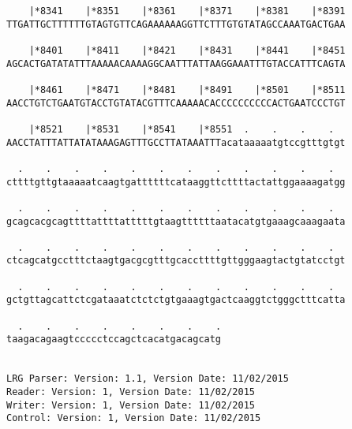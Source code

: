 \documentclass{article}
\begin{document}
\begin{Verbatim}
    |*8341    |*8351    |*8361    |*8371    |*8381    |*8391
TTGATTGCTTTTTTGTAGTGTTCAGAAAAAAGGTTCTTTGTGTATAGCCAAATGACTGAA
                                                            
    |*8401    |*8411    |*8421    |*8431    |*8441    |*8451
AGCACTGATATATTTAAAAACAAAAGGCAATTTATTAAGGAAATTTGTACCATTTCAGTA
                                                            
    |*8461    |*8471    |*8481    |*8491    |*8501    |*8511
AACCTGTCTGAATGTACCTGTATACGTTTCAAAAACACCCCCCCCCCACTGAATCCCTGT
                                                            
    |*8521    |*8531    |*8541    |*8551  .    .    .    .  
AACCTATTTATTATATAAAGAGTTTGCCTTATAAATTTacataaaaatgtccgtttgtgt
                                                            
  .    .    .    .    .    .    .    .    .    .    .    .  
cttttgttgtaaaaatcaagtgattttttcataaggttcttttactattggaaaagatgg
                                                            
  .    .    .    .    .    .    .    .    .    .    .    .  
gcagcacgcagttttattttatttttgtaagttttttaatacatgtgaaagcaaagaata
                                                            
  .    .    .    .    .    .    .    .    .    .    .    .  
ctcagcatgcctttctaagtgacgcgtttgcaccttttgttgggaagtactgtatcctgt
                                                            
  .    .    .    .    .    .    .    .    .    .    .    .  
gctgttagcattctcgataaatctctctgtgaaagtgactcaaggtctgggctttcatta
                                                            
  .    .    .    .    .    .    .    .
taagacagaagtccccctccagctcacatgacagcatg
                                      
                                      
LRG Parser: Version: 1.1, Version Date: 11/02/2015
Reader: Version: 1, Version Date: 11/02/2015
Writer: Version: 1, Version Date: 11/02/2015
Control: Version: 1, Version Date: 11/02/2015
\end{Verbatim}
\end{document}
